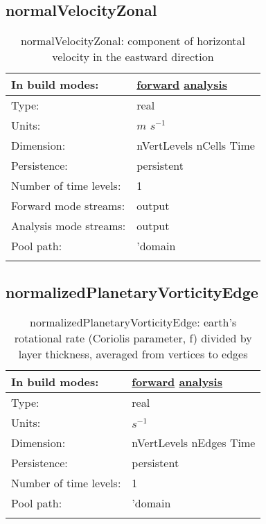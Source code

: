 \subsection[normalVelocityZonal]{normalVelocityZonal}
\label{subsec:var_sec_diagnostics_normalVelocityZonal}
\begin{center}
\begin{longtable}{| p{2.0in} | p{4.0in} |}
        \hline 
        In build modes: & \hyperref[subsec:forward_var_tab_diagnostics]{forward} \hyperref[subsec:analysis_var_tab_diagnostics]{analysis} \\
        \hline 
        Type: & real \\
        \hline 
        Units: & $m$ $s^{-1}$ \\
        \hline 
        Dimension: & nVertLevels nCells Time \\
        \hline 
        Persistence: & persistent \\
        \hline 
        Number of time levels: & 1 \\
        \hline 
		 Forward mode streams: &  output \\
        \hline 
		 Analysis mode streams: &  output \\
        \hline 
            Pool path: & 'domain %
 \\
		 \hline 
    \caption{normalVelocityZonal: component of horizontal velocity in the eastward direction}
\end{longtable}
\end{center}
\subsection[normalizedPlanetaryVorticityEdge]{normalizedPlanetaryVorticityEdge}
\label{subsec:var_sec_diagnostics_normalizedPlanetaryVorticityEdge}
\begin{center}
\begin{longtable}{| p{2.0in} | p{4.0in} |}
        \hline 
        In build modes: & \hyperref[subsec:forward_var_tab_diagnostics]{forward} \hyperref[subsec:analysis_var_tab_diagnostics]{analysis} \\
        \hline 
        Type: & real \\
        \hline 
        Units: & $s^{-1}$ \\
        \hline 
        Dimension: & nVertLevels nEdges Time \\
        \hline 
        Persistence: & persistent \\
        \hline 
        Number of time levels: & 1 \\
        \hline 
            Pool path: & 'domain %
 \\
		 \hline 
    \caption{normalizedPlanetaryVorticityEdge: earth's rotational rate (Coriolis parameter, f) divided by layer thickness, averaged from vertices to edges}
\end{longtable}
\end{center}
